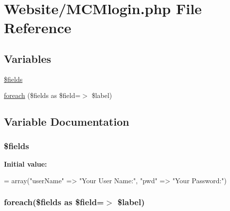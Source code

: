 \hypertarget{_m_c_mlogin_8php}{\section{Website/\-M\-C\-Mlogin.php File Reference}
\label{_m_c_mlogin_8php}
}
\subsection*{Variables}
\begin{DoxyCompactItemize}
\item 
\hyperlink{_m_c_mlogin_8php_ab2303c817e3b402b77b7f99627b9c319}{\$fields}
\item 
\hyperlink{_m_c_mlogin_8php_a58d12ec81e33be9b80508ee874adb2c1}{foreach} (\$fields as \$field=$>$ \$label)
\end{DoxyCompactItemize}


\subsection{Variable Documentation}
\hypertarget{_m_c_mlogin_8php_ab2303c817e3b402b77b7f99627b9c319}{
\subsubsection[{\$fields}]{\setlength{\rightskip}{0pt plus 5cm}\$fields}}\label{_m_c_mlogin_8php_ab2303c817e3b402b77b7f99627b9c319}
{\bfseries Initial value\-:}
\begin{DoxyCode}
= array(\textcolor{stringliteral}{"userName"} => \textcolor{stringliteral}{"Your User Name:"},
                    \textcolor{stringliteral}{"pwd"} => \textcolor{stringliteral}{"Your Password:"})
\end{DoxyCode}
\hypertarget{_m_c_mlogin_8php_a58d12ec81e33be9b80508ee874adb2c1}{
\subsubsection[{foreach}]{\setlength{\rightskip}{0pt plus 5cm}foreach(\$fields as \$field=$>$ \$label)}}\label{_m_c_mlogin_8php_a58d12ec81e33be9b80508ee874adb2c1}
